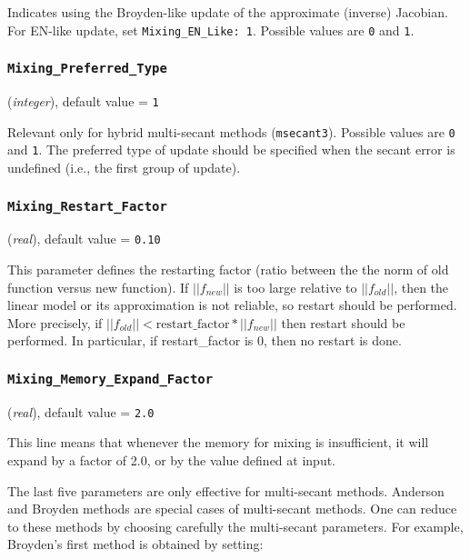 \documentclass{article}
\begin{document}
Indicates using the Broyden-like update of the approximate
(inverse) Jacobian. For EN-like update, set {\tt Mixing\_EN\_Like: 1}.
Possible values are {\tt 0} and {\tt 1}.

\subsubsection{\tt Mixing\_Preferred\_Type
\label{MixingPreferredType}}
({\it integer}),
default value = {\tt 1 }

Relevant only for hybrid multi-secant methods ({\tt msecant3}). Possible
values are {\tt 0} and {\tt 1}. The preferred type of update should be
specified when the secant error is undefined (i.e., the first group of update).

\subsubsection{\tt Mixing\_Restart\_Factor
\label{MixingRestartFactor}}
({\it real}),
default value = {\tt 0.10 }

This parameter defines the restarting factor (ratio between the the norm of
old function versus new function). If $||f_{new}||$ is too large relative
to $||f_{old}||$, then the linear model or its approximation is not
reliable, so restart should be performed. More precisely,
if $||f_{old}|| < \mbox{restart\_factor} * ||f_{new}||$ then restart should be
performed. In particular, if restart\_factor is 0, then no restart is done.

\subsubsection{\tt Mixing\_Memory\_Expand\_Factor
\label{MixingMemoryExpandFactor}}
({\it real}),
default value = {\tt 2.0 }

This line means that whenever the memory for mixing is insufficient, it will
expand by a factor of 2.0, or by the value defined at input.


The last five parameters are only effective for multi-secant
methods. Anderson and Broyden methods are special cases of multi-secant
methods. One
can reduce to these methods by choosing carefully the multi-secant parameters.
For example, Broyden's first method is obtained by setting:
\end{document}
